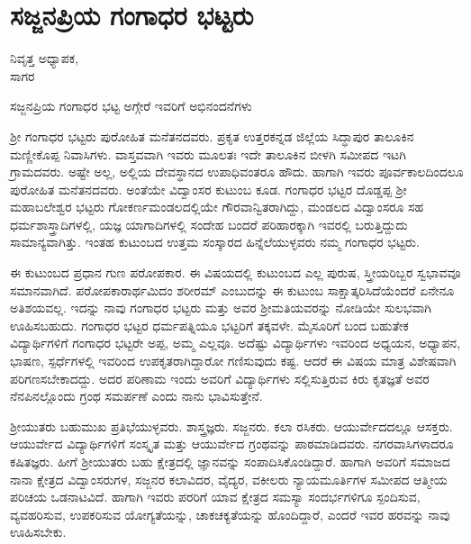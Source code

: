 {\fontsize{14}{16}\selectfont
\chapter{ಸಜ್ಜನಪ್ರಿಯ ಗಂಗಾಧರ ಭಟ್ಟರು}

\begin{center}
\smallskip

ನಿವೃತ್ತ ಅಧ್ಯಾಪಕ,\\ 
ಸಾಗರ
\addrule
\end{center}

ಸಜ್ಜನಪ್ರಿಯ ಗಂಗಾಧರ ಭಟ್ಟ ಅಗ್ಗೇರೆ ಇವರಿಗೆ ಅಭಿನಂದನೆಗಳು

ಶ್ರೀ ಗಂಗಾಧರ ಭಟ್ಟರು ಪುರೋಹಿತ ಮನೆತನದವರು. ಪ್ರಕೃತ  ಉತ್ತರಕನ್ನಡ ಜಿಲ್ಲೆಯ ಸಿದ್ಧಾಪುರ ತಾಲೂಕಿನ ಮಣ್ಣೀಕೊಪ್ಪ ನಿವಾಸಿಗಳು. ವಾಸ್ತವವಾಗಿ ಇವರು ಮೂಲತಃ ಇದೇ ತಾಲೂಕಿನ ಬೀಳಗಿ ಸಮೀಪದ ಇಟಗಿ ಗ್ರಾಮದವರು. ಅಷ್ಟೇ ಅಲ್ಲ, ಅಲ್ಲಿಯ ದೇವಸ್ಥಾನದ ಉಪಾಧಿವಂತರೂ ಹೌದು. ಹಾಗಾಗಿ ಇವರು ಪೂರ್ವಕಾಲದಿಂದಲೂ ಪುರೋಹಿತ ಮನೆತನದವರು. ಅಂತೆಯೇ ವಿದ್ವಾಂಸರ ಕುಟುಂಬ ಕೂಡ. ಗಂಗಾಧರ ಭಟ್ಟರ ದೊಡ್ಡಪ್ಪ ಶ್ರೀ ಮಹಾಬಲೇಶ್ವರ ಭಟ್ಟರು ಗೋಕರ್ಣಮಂಡಲದಲ್ಲಿಯೇ ಗೌರವಾನ್ವಿತರಾಗಿದ್ದು, ಮಂಡಲದ ವಿದ್ವಾಂಸರೂ ಸಹ ಧರ್ಮಶಾಸ್ತ್ರಾದಿಗಳಲ್ಲಿ, ಯಜ್ಞ  \enginline{-}  ಯಾಗಾದಿಗಳಲ್ಲಿ ಸಂದೇಹ ಬಂದರೆ ಪರಿಹಾರಕ್ಕಾಗಿ ಇವರಲ್ಲಿ ಬರುತ್ತಿದ್ದುದು ಸಾಮಾನ್ಯವಾಗಿತ್ತು. ಇಂತಹ ಕುಟುಂಬದ ಉತ್ತಮ ಸಂಸ್ಕಾರದ ಹಿನ್ನೆಲೆಯುಳ್ಳವರು ನಮ್ಮ ಗಂಗಾಧರ ಭಟ್ಟರು.

ಈ ಕುಟುಂಬದ ಪ್ರಧಾನ ಗುಣ ಪರೋಪಕಾರ. ಈ ವಿಷಯದಲ್ಲಿ ಕುಟುಂಬದ ಎಲ್ಲ ಪುರುಷ, ಸ್ತ್ರೀಯರಿಬ್ಬರ ಸ್ವಭಾವವೂ ಸಮಾನವಾಗಿದೆ. ಪರೋಪಕಾರಾರ್ಥಮಿದಂ ಶರೀರಮ್ ಎಂಬುದನ್ನು ಈ ಕುಟುಂಬ ಸಾಕ್ಷಾತ್ಕರಿಸಿದೆಯೆಂದರೆ ಏನೇನೂ ಅತಿಶಯವಲ್ಲ. ಇದನ್ನು ನಾವು ಗಂಗಾಧರ ಭಟ್ಟರು ಮತ್ತು ಅವರ ಶ್ರೀಮತಿಯವರನ್ನು ನೋಡಿಯೇ ಸುಲಭವಾಗಿ ಊಹಿಸಬಹುದು. ಗಂಗಾಧರ ಭಟ್ಟರ ಧರ್ಮಪತ್ನಿಯೂ ಭಟ್ಟರಿಗೆ ತಕ್ಕವಳೇ. ಮೈಸೂರಿಗೆ ಬಂದ ಬಹುತೇಕ ವಿದ್ಯಾರ್ಥಿಗಳಿಗೆ ಗಂಗಾಧರ ಭಟ್ಟರೇ ಅಪ್ಪ, ಅಮ್ಮ ಎಲ್ಲವೂ. ಅದೆಷ್ಟು ವಿದ್ಯಾರ್ಥಿಗಳು ಇವರಿಂದ ಅಧ್ಯಯನ, ಅಧ್ಯಾಪನ, ಭಾಷಣ, ಸ್ಪರ್ಧೆಗಳಲ್ಲಿ ಇವರಿಂದ ಉಪಕೃತರಾಗಿದ್ದಾರೋ ಗಣಿಸುವುದು ಕಷ್ಟ. ಆದರೆ ಈ ವಿಷಯ ಮಾತ್ರ ವಿಶೇಷವಾಗಿ ಪರಿಗಣಸಬೇಕಾದದ್ದು. ಅದರ ಪರಿಣಾಮ ಇಂದು ಅವರಿಗೆ ವಿದ್ಯಾರ್ಥಿಗಳು ಸಲ್ಲಿಸುತ್ತಿರುವ ಕಿರು ಕೃತಜ್ಞತೆ   \enginline{-}   ಅವರ ನೆನಪಿನಲ್ಲೊಂದು ಗ್ರಂಥ ಸಮರ್ಪಣೆ ಎಂದು ನಾನು ಭಾವಿಸುತ್ತೇನೆ.

ಶ್ರೀಯುತರು ಬಹುಮುಖ ಪ್ರತಿಭೆಯುಳ್ಳವರು. ಶಾಸ್ತ್ರಜ್ಞರು. ಸಜ್ಜನರು. ಕಲಾ ರಸಿಕರು. ಆಯುರ್ವೇದದಲ್ಲೂ ಆಸಕ್ತರು. ಆಯುರ್ವೇದ ವಿದ್ಯಾರ್ಥಿಗಳಿಗೆ ಸಂಸ್ಕೃತ ಮತ್ತು ಆಯುರ್ವೇದ ಗ್ರಂಥವನ್ನು ಪಾಠಮಾಡಿದವರು. ನಗರವಾಸಿಗಳಾದರೂ ಕಷಿತಜ್ಞರು. ಹೀಗೆ ಶ್ರೀಯುತರು ಬಹು ಕ್ಷೇತ್ರದಲ್ಲಿ ಜ್ಞಾನವನ್ನು ಸಂಪಾದಿಸಿಕೊಂಡಿದ್ದಾರೆ. ಹಾಗಾಗಿ ಅವರಿಗೆ ಸಮಾಜದ ನಾನಾ ಕ್ಷೇತ್ರದ ವಿದ್ವಾಂಸರುಗಳ, ಸಜ್ಜನರ ಕಲಾವಿದರ, ವೈದ್ಯರ, ವಕೀಲರು  \enginline{-}   ನ್ಯಾಯಮೂರ್ತಿಗಳ ಸಮೀಪದ ಆತ್ಮೀಯ ಪರಿಚಯ   \enginline{-}   ಒಡನಾಟವಿದೆ. ಹಾಗಾಗಿ ಇವರು ಪರರಿಗೆ ಯಾವ ಕ್ಷೇತ್ರದ ಸಮಸ್ಯಾ   \enginline{-}   ಸಂದರ್ಭಗಳಿಗೂ ಸ್ಪಂದಿಸುವ, ವ್ಯವಹರಿಸುವ, ಉಪಕರಿಸುವ ಯೋಗ್ಯತೆಯನ್ನು, ಚಾಕಚಕ್ಯತೆಯನ್ನು ಹೊಂದಿದ್ದಾರೆ, ಎಂದರೆ ಇವರ ಹರವನ್ನು ನಾವು ಊಹಿಸಬೇಕು. 

}

